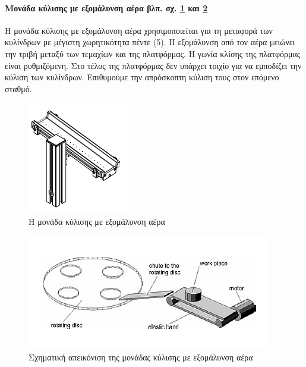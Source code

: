 \documentclass[a4paper,12pt,twoside]{report}
\begin{document}
				\paragraph{Μονάδα κύλισης με εξομάλυνση αέρα {\footnotesize βλπ. σχ. \ref{φωτ:Η μονάδα κύλισης με εξομάλυνση αέρα από Festo} και \ref{φωτ:Σχηματική απεικόνιση της μονάδας κύλισης με εξομάλυνση αέρα από Θράμπο}}} {Η μονάδα κύλισης με εξομάλυνση αέρα χρησιμοποιείται για τη μεταφορά των κυλίνδρων με μέγιστη χωρητικότητα πέντε (5). Η εξομάλυνση από τον αέρα μειώνει την τριβή μεταξύ των τεμαχίων και της πλατφόρμας. Η γωνία κλίσης της πλατφόρμας είναι ρυθμιζόμενη. Στο τέλος της πλατφόρμας δεν υπάρχει τοιχίο για να εμποδίζει την κύλιση των κυλίνδρων. Επιθυμούμε την απρόσκοπτη κύλιση τους στον επόμενο σταθμό.
				}
				\begin{figure}[hp]
					\centering
					\includegraphics[scale=1]{TestingStationAirCushionedSlideModule.png}
					\caption{Η μονάδα κύλισης με εξομάλυνση αέρα \cite{FestoMPSTestingStationManual}}
					\label{φωτ:Η μονάδα κύλισης με εξομάλυνση αέρα από Festo}
				\end{figure}
				\begin{figure}[hp]
					\centering
					\includegraphics[scale=1]{TestingStationAirCushionedSlideTrambo.png}
					\caption{Σχηματική απεικόνιση της μονάδας κύλισης με εξομάλυνση αέρα \cite{ΤοΦυσικόΣύστημαFestoMPS}}
					\label{φωτ:Σχηματική απεικόνιση της μονάδας κύλισης με εξομάλυνση αέρα από Θράμπο}
				\end{figure}
				
\end{document}
